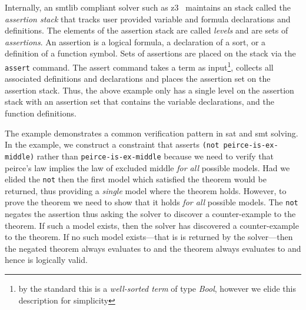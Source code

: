 Internally, an \acl{smtlib} compliant solver such as z3~\cite{10.1007/978-3-540-78800-3_24}
maintains an stack called the \emph{assertion stack} that tracks user provided
variable and formula declarations and definitions. The elements of the assertion
stack are called \emph{levels} and are sets of \emph{assertions}.
%
An assertion is a logical formula, a declaration of a sort, or a definition of a
function symbol. Sets of assertions are placed on the stack via the
\lstinline{assert} command. The assert command takes a term as input\footnote{by
  the standard this is a \emph{well-sorted term} of type \emph{Bool}, however we
  elide this description for simplicity}, collects all associated definitions
and declarations and places the assertion set on the assertion stack. Thus, the
above example only has a single level on the assertion stack with an assertion
set that contains the variable declarations, and the function definitions.

The example demonstrates a common verification pattern in \ac{sat} and \ac{smt}
solving. In the example, we construct a constraint that asserts
\lstinline{(not peirce-is-ex-middle)} rather than
\lstinline{peirce-is-ex-middle} because we need to verify that peirce's law
implies the law of excluded middle \emph{for all} possible models. Had we elided
the \lstinline{not} then the first model which satisfied the theorem would be
returned, thus providing a \emph{single} model where the theorem holds. However,
to prove the theorem we need to show that it holds \emph{for all} possible
models. The \lstinline{not} negates the assertion thus asking the solver to
discover a counter-example to the theorem. If such a model exists, then the
solver has discovered a counter-example to the theorem. If no such model
exists---that is  is returned by the solver---then the negated theorem
always evaluates to \fls{} and the theorem always evaluates to \tru{} and hence
is logically valid.


